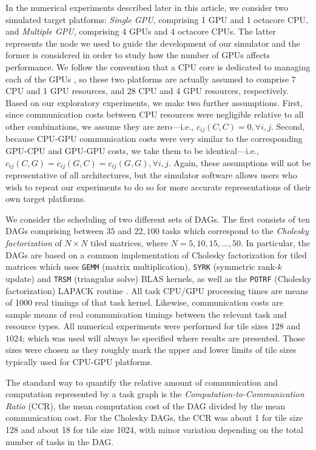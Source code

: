 \documentclass[runningheads]{llncs}
\begin{document}
In the numerical experiments described later in this article, we consider two simulated target platforms: {\em Single GPU}, comprising 1 GPU and 1 octacore CPU, and {\em Multiple GPU}, comprising 4 GPUs and 4 octacore CPUs. The latter represents the node we used to guide the development of our simulator and the former is considered in order to study how the number of GPUs affects performance. We follow the convention that a CPU core is dedicated to managing each of the GPUs \cite{augonnet2011starpu}, so these two platforms are actually assumed to comprise 7 CPU and 1 GPU resources, and 28 CPU and 4 GPU resources, respectively. Based on our exploratory experiments, we make two further assumptions. First, since communication costs between CPU resources were negligible relative to all other combinations, we assume they are zero---i.e., $c_{ij}(C, C) = 0, \forall i, j$. Second, because CPU-GPU communication costs were very similar to the corresponding GPU-CPU and GPU-GPU costs, we take them to be identical---i.e., $c_{ij}(C, G) = c_{ij}(G, C) = c_{ij}(G, G), \forall i, j$. Again, these assumptions will not be representative of all architectures, but the simulator software allows users who wish to repeat our experiments to do so for more accurate representations of their own target platforms. 

We consider the scheduling of two different sets of DAGs. The first consists of ten DAGs comprising between $35$ and $22,100$ tasks which correspond to the {\em Cholesky factorization} of $N \times N$ tiled matrices, where $N = 5, 10, 15, \dots, 50$. In particular, the DAGs are based on a common implementation of Cholesky factorization for tiled matrices which uses {\tt GEMM} (matrix multiplication), {\tt SYRK} (symmetric rank-$k$ update) and {\tt TRSM} (triangular solve) BLAS kernels, as well as the {\tt POTRF} (Cholesky factorization) LAPACK routine \cite{Dongarra:1990:SLB:77626.79170}. All task CPU/GPU processing times are means of 1000 real timings of that task kernel. Likewise, communication costs are sample means of real communication timings between the relevant task and resource types. All numerical experiments were performed for tile sizes $128$ and $1024$; which was used will always be specified where results are presented. Those sizes were chosen as they roughly mark the upper and lower limits of tile sizes typically used for CPU-GPU platforms.

The standard way to quantify the relative amount of communication and computation represented by a task graph is the {\em Computation-to-Communication Ratio} (CCR), the mean computation cost of the DAG divided by the mean communication cost. For the Cholesky DAGs, the CCR was about 1 for tile size 128 and about 18 for tile size 1024, with minor variation depending on the total number of tasks in the DAG. 
\end{document}

